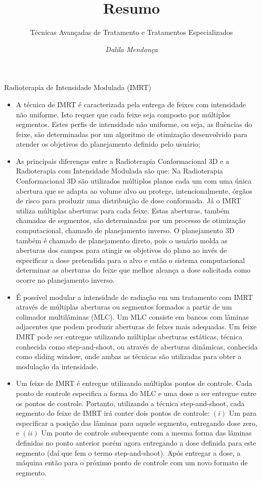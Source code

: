\documentclass[11pt,a4paper]{article}
\title{Resumo}
\author{Técnicas Avançadas de Tratamento e Tratamentos Especializados \nocite{*}}
\date{\textit{Dalila Mendonça}}
\newcounter{exemplo}
\begin{document}
	\maketitle


\begin{exemplo}
    \textcolor{CarnationPink}{Radioterapia de Intensidade Modulada (IMRT)}
    \begin{itemize}
        \item A técnica de IMRT é caracterizada pela entrega de feixes com intensidade não uniforme. Isto requer que cada feixe seja composto por múltiplos segmentos. Estes perfis de intensidade não uniforme, ou seja, as fluências do feixe,  são determinadas por um algoritmo de otimização desenvolvido para atender os objetivos do planejamento definido pelo usuário;
        
        \item As principais diferenças entre a Radioterapia Conformacional 3D e a Radioterapia com Intensidade Modulada são que: Na Radioterapia Conformacional 3D são utilizados múltiplos planos cada um com uma única abertura que se adapta ao volume alvo ou protege, intencionalmente, órgãos de risco para produzir uma distribuição de dose conformada. Já o IMRT utiliza múltiplas aberturas para cada feixe. Estas aberturas, também chamadas de segmentos, são determinadas por um processo de otimização computacional, chamado de \textcolor{CarnationPink}{planejamento inverso}. O planejamento 3D também é chamado de \textcolor{CarnationPink}{planejamento direto}, pois o usuário molda as aberturas dos campos para atingir os objetivos do plano ao invés de especificar a dose pretendida para o alvo e então o sistema computacional determinar as aberturas do feixe que melhor alcança a dose solicitada como ocorre no planejamento inverso.
        
        \item É possível modular a intensidade de radiação em um tratamento com IMRT através de múltiplas aberturas ou segmentos formados a partir de um colimador multilâminas (MLC). Um MLC consiste em bancos com lâminas adjacentes que podem produzir aberturas de feixes mais adequadas. Um feixe IMRT pode ser entregue utilizando múltiplas aberturas estáticas, técnica conhecida como step-and-shoot, ou através de aberturas dinâmicas, conhecida como sliding window, onde ambas as técnicas são utilizadas para obter a modulação da intensidade. 
        
        \item Um feixe de IMRT é entregue utilizando múltiplos pontos de controle. Cada ponto de controle especifica a forma do MLC e uma dose a ser entregue entre os pontos de controle. Portanto, utilizando a técnica \textcolor{CarnationPink}{step-and-shoot}, cada segmento do feixe de IMRT irá conter dois pontos de controle: $(i)$ Um para especificar a posição das lâminas para aquele segmento, entregando dose zero, e $(ii)$ Um ponto de controle subsequente com a mesma forma das lâminas definidas no ponto anterior  porém agora entregando a dose definida para este segmento (daí que fem o termo step-and-shoot). Após entregar a dose, a máquina então para o próximo ponto de controle com um novo formato de segmento.
        

\end{itemize}
\end{exemplo}
\end{document}
